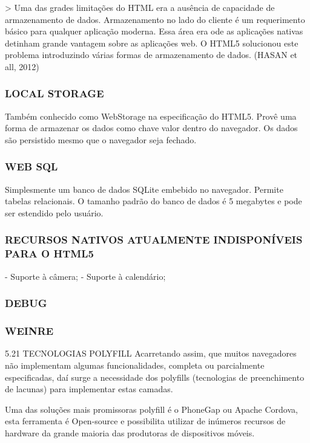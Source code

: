 \documentclass[11pt,a4paper]{article}
\begin{document}
> Uma das grades limitações do HTML era a ausência de capacidade
de armazenamento de dados. Armazenamento no lado do cliente é um
requerimento básico para qualquer aplicação moderna. Essa área
era ode as aplicações nativas detinham grande vantagem sobre as
aplicações web. O HTML5 solucionou este problema introduzindo várias
formas de armazenamento de dados. (HASAN et all, 2012)

\subsubsection{ LOCAL STORAGE}

Também conhecido como WebStorage na especificação do HTML5. Provê
uma forma de armazenar os dados como chave valor dentro do navegador. Os
dados são persistido mesmo que o navegador seja fechado.

\subsubsection{WEB SQL}

Simplesmente um banco de dados SQLite embebido no navegador. Permite
tabelas relacionais. O tamanho padrão do banco de dados é 5 megabytes
e pode ser estendido pelo usuário.

\subsubsection{ RECURSOS NATIVOS ATUALMENTE INDISPONÍVEIS PARA O HTML5}

- Suporte à câmera;
- Suporte à calendário;

\subsubsection{DEBUG}

\subsubsection{ WEINRE}

 5.21  TECNOLOGIAS POLYFILL
Acarretando assim, que muitos navegadores não implementam algumas
funcionalidades, completa ou parcialmente especificadas, daí surge a
necessidade dos polyfills (tecnologias de preenchimento de lacunas) para
implementar estas camadas.

Uma das soluções mais promissoras polyfill é o PhoneGap ou Apache
Cordova, esta ferramenta é Open-source e possibilita utilizar de
inúmeros recursos de hardware da grande maioria das produtoras de
dispositivos móveis.
\end{document}

